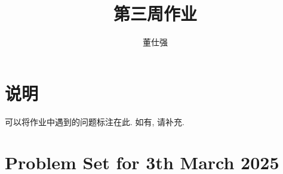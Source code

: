 \documentclass[11pt]{ctexart}
\title{第三周作业}
\author{董仕强}
\theoremstyle{definition}
\numberwithin{equation}{section}
\theoremstyle{definition}
\theoremstyle{remark}
\begin{document}
\maketitle

\section{说明}

可以将作业中遇到的问题标注在此. 如有, 请补充.

\tableofcontents

\newpage



\section{Problem Set for 3th March 2025}
\end{document}
